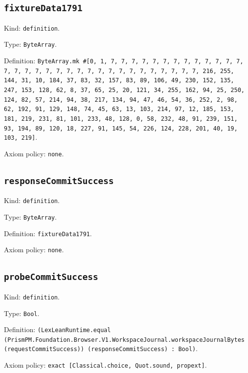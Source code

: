 \documentclass[11pt]{article}
\begin{document}
\subsection*{\texttt{fixtureData1791}}
\noindent Kind: \texttt{definition}.\par
\noindent Type: \texttt{ByteArray}.\par
\noindent Definition: \texttt{ByteArray.mk \#[0, 1, 7, 7, 7, 7, 7, 7, 7, 7, 7, 7, 7, 7, 7, 7, 7, 7, 7, 7, 7, 7, 7, 7, 7, 7, 7, 7, 7, 7, 7, 7, 7, 7, 216, 255, 144, 31, 10, 184, 37, 83, 32, 157, 83, 89, 106, 49, 230, 152, 135, 247, 153, 128, 62, 8, 37, 65, 25, 20, 121, 34, 255, 162, 94, 25, 250, 124, 82, 57, 214, 94, 38, 217, 134, 94, 47, 46, 54, 36, 252, 2, 98, 62, 192, 91, 129, 148, 74, 45, 63, 13, 103, 214, 97, 12, 185, 153, 181, 219, 231, 81, 101, 233, 48, 128, 0, 58, 232, 48, 91, 239, 151, 93, 194, 89, 120, 18, 227, 91, 145, 54, 226, 124, 228, 201, 40, 19, 103, 219]}.\par
\noindent Axiom policy: \texttt{none}.\par
\subsection*{\texttt{responseCommitSuccess}}
\noindent Kind: \texttt{definition}.\par
\noindent Type: \texttt{ByteArray}.\par
\noindent Definition: \texttt{fixtureData1791}.\par
\noindent Axiom policy: \texttt{none}.\par
\subsection*{\texttt{probeCommitSuccess}}
\noindent Kind: \texttt{definition}.\par
\noindent Type: \texttt{Bool}.\par
\noindent Definition: \texttt{(LexLeanRuntime.equal (PrismPM.Foundation.Browser.V1.WorkspaceJournal.workspaceJournalBytes (requestCommitSuccess)) (responseCommitSuccess) : Bool)}.\par
\noindent Axiom policy: \texttt{exact [Classical.choice, Quot.sound, propext]}.\par
\end{document}
